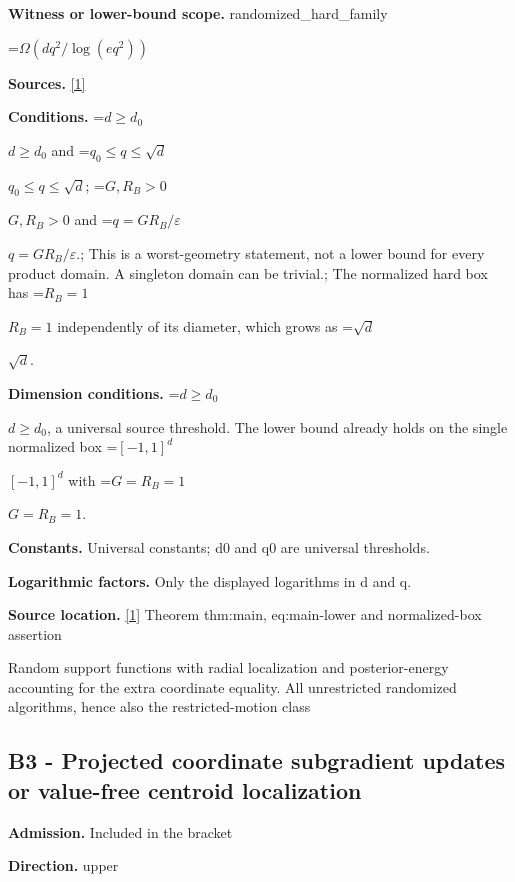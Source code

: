 \documentclass[10pt,a4paper]{article}
\newcommand{\AtlasMath}[1]{\par\begingroup\centering\setbox0=\hbox{$\displaystyle #1$}\ifdim\wd0>1.4\linewidth\typeout{ATLAS WIDE FORMULA: \the\wd0}\fi\ifdim\wd0>\linewidth\resizebox{\linewidth}{!}{\box0}\else\box0\fi\par\endgroup}
\newcommand{\AtlasInlineMath}[1]{\begingroup\setbox0=\hbox{$#1$}\ifdim\wd0>.4\linewidth\endgroup\AtlasMath{#1}\else\endgroup$#1$\fi}
\begin{document}
\textbf{Witness or lower-bound scope.} randomized\_hard\_family



\AtlasMath{\Omega(dq^2/\log(eq^2))}


\textbf{Sources.} \href{https://github.com/WU-Wendao/Colombo/blob/main/colombo_sensorium/Complexity_altas/data/sources/colombo/U03/manuscript.pdf}{[1]}



\textbf{Conditions.} \AtlasInlineMath{d\ge d_0} and \AtlasInlineMath{q_0\le q\le\sqrt d}; \AtlasInlineMath{G,R_B>0} and \AtlasInlineMath{q=GR_B/\varepsilon}.; This is a worst-geometry statement, not a lower bound for every product domain. A singleton domain can be trivial.; The normalized hard box has \AtlasInlineMath{R_B=1} independently of its diameter, which grows as \AtlasInlineMath{\sqrt d}.



\textbf{Dimension conditions.} \AtlasInlineMath{d\ge d_0}, a universal source threshold. The lower bound already holds on the single normalized box \AtlasInlineMath{[-1,1]^d} with \AtlasInlineMath{G=R_B=1}.



\textbf{Constants.} Universal constants; d0 and q0 are universal thresholds.



\textbf{Logarithmic factors.} Only the displayed logarithms in d and q.



\textbf{Source location.} \href{https://github.com/WU-Wendao/Colombo/blob/main/colombo_sensorium/Complexity_altas/data/sources/colombo/U03/manuscript.pdf}{[1]} Theorem thm:main, eq:main-lower and normalized-box assertion



Random support functions with radial localization and posterior-energy accounting for the extra coordinate equality. All unrestricted randomized algorithms, hence also the restricted-motion class



\subsection{B3 - Projected coordinate subgradient updates or value-free centroid localization}


\textbf{Admission.} Included in the bracket



\textbf{Direction.} upper
\end{document}
